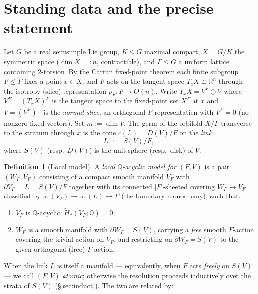 \documentclass[12pt]{article}
\theoremstyle{definition}
\newtheorem{definition}[theorem]{Definition}
\begin{document}
\section{Standing data and the precise statement}\label{sec:setup}

Let $G$ be a real semisimple Lie group, $K\le G$ maximal compact,
$X=G/K$ the symmetric space ($\dim X=:n$, contractible), and $\Gamma\le G$ a
uniform lattice containing $2$-torsion. By the Cartan fixed-point theorem each
finite subgroup $F\le\Gamma$ fixes a point $x\in X$, and $F$ acts on the
tangent space $T_xX\cong\mathbb{R}^{n}$ through the isotropy (slice)
representation $\rho_F\colon F\to O(n)$. Write $T_xX=V^F\oplus V$ where
$V^F=(T_xX)^F$ is the tangent space to the fixed-point set $X^F$ at $x$ and
$V=(V^F)^\perp$ is the \emph{normal slice}, an orthogonal $F$-representation
with $V^F=0$ (no nonzero fixed vectors). Set $m:=\dim V$. The germ of the
orbifold $X/\Gamma$ transverse to the stratum through $x$ is the cone
$c(L)=D(V)/F$ on the \emph{link}
\[
   L \;:=\; S(V)/F,
\]
where $S(V)$ (resp.\ $D(V)$) is the unit sphere (resp.\ disk) of $V$.

\begin{definition}[Local model]\label{def:model}
A \emph{local $\mathbb{Q}$-acyclic model for $(F,V)$} is a pair $(W_F,V_F)$
consisting of a compact smooth manifold $V_F$ with $\partial V_F=L=S(V)/F$
together with its connected $|F|$-sheeted covering $W_F\to V_F$ classified by
$\pi_1(V_F)\to\pi_1(L)\to F$ (the boundary monodromy), such that:
\begin{enumerate}
\item[(M1)] $V_F$ is $\mathbb{Q}$-acyclic: $\widetilde H_*(V_F;\mathbb{Q})=0$;
\item[(M2)] $W_F$ is a smooth manifold with $\partial W_F=S(V)$, carrying a
\emph{free} smooth $F$-action covering the trivial action on $V_F$, and
restricting on $\partial W_F=S(V)$ to the given orthogonal (free) $F$-action.
\end{enumerate}
\end{definition}

When the link $L$ is itself a manifold --- equivalently, when $F$ acts
\emph{freely} on $S(V)$ --- we call $(F,V)$ \emph{atomic}; otherwise the
resolution proceeds inductively over the strata of $S(V)$ (\S\ref{sec:induct}).
The two are related by:
\end{document}
